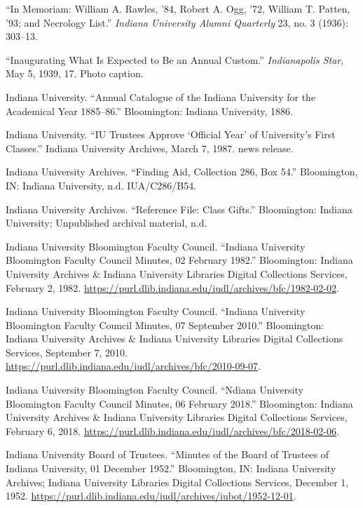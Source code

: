 \documentclass[
  american,
  letterpaper,
]{scrreprt}
\newlength{\cslhangindent}
\newenvironment{CSLReferences}[2] %
 {\begin{list}{}{%
  \setlength{\itemindent}{0pt}
  \setlength{\leftmargin}{0pt}
  \setlength{\parsep}{0pt}
  \ifodd #1
   \setlength{\leftmargin}{\cslhangindent}
   \setlength{\itemindent}{-1\cslhangindent}
  \fi
  \setlength{\itemsep}{#2\baselineskip}}}
 {\end{list}}
\begin{document}
\begin{CSLReferences}{1}{0}
{``{In Memoriam: William A. Rawles, '84, Robert A. Ogg, '72, William T.
Patten, '93; and Necrology List}.''} \emph{Indiana University Alumni
Quarterly} 23, no. 3 (1936): 303--13.

{``Inaugurating What Is Expected to Be an Annual Custom.''}
\emph{Indianapolis Star}, May 5, 1939, 17. Photo caption.

Indiana University. {``Annual Catalogue of the Indiana University for
the Academical Year 1885--86.''} Bloomington: Indiana University, 1886.

Indiana University. {``IU Trustees Approve {`Official Year'} of
University's First Classes.''} Indiana University Archives, March 7,
1987. news release.

Indiana University Archives. {``Finding Aid, Collection 286, Box 54.''}
Bloomington, IN: Indiana University, n.d. IUA/C286/B54.

Indiana University Archives. {``Reference File: Class Gifts.''}
Bloomington: Indiana University; Unpublished archival material, n.d.

Indiana University Bloomington Faculty Council. {``Indiana University
Bloomington Faculty Council Minutes, 02 February 1982.''} Bloomington:
Indiana University Archives \& Indiana University Libraries Digital
Collections Services, February 2, 1982.
\url{https://purl.dlib.indiana.edu/iudl/archives/bfc/1982-02-02}.

Indiana University Bloomington Faculty Council. {``Indiana University
Bloomington Faculty Council Minutes, 07 September 2010.''} Bloomington:
Indiana University Archives \& Indiana University Libraries Digital
Collections Services, September 7, 2010.
\url{https://purl.dlib.indiana.edu/iudl/archives/bfc/2010-09-07}.

Indiana University Bloomington Faculty Council. {``Ndiana University
Bloomington Faculty Council Minutes, 06 February 2018.''} Bloomington:
Indiana University Archives \& Indiana University Libraries Digital
Collections Services, February 6, 2018.
\url{https://purl.dlib.indiana.edu/iudl/archives/bfc/2018-02-06}.

Indiana University Board of Trustees. {``Minutes of the Board of
Trustees of Indiana University, 01 December 1952.''} Bloomington, IN:
Indiana University Archives; Indiana University Libraries Digital
Collections Services, December 1, 1952.
\url{https://purl.dlib.indiana.edu/iudl/archives/iubot/1952-12-01}.


\end{CSLReferences}
\end{document}
